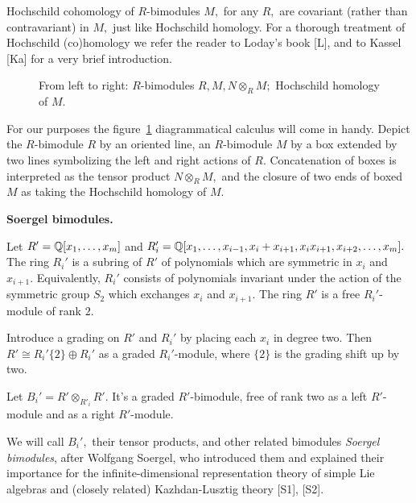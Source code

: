 \documentclass[12pt]{article}
\begin{document}
Hochschild cohomology of $R$-bimodules $M,$  for any $R,$ are 
covariant (rather than contravariant) in $M,$ just like Hochschild homology. 
For a thorough treatment of Hochschild (co)homology we refer the reader to 
Loday's book [L], and to Kassel [Ka] for a very brief introduction. 

\begin{figure} [htb]  \caption{From left to right: 
$R$-bimodules $R, M, N\otimes_R M;$ Hochschild homology of $M.$}\label{bimodules} 
\end{figure} 

\vspace{0.1in} 

For our purposes the figure~\ref{bimodules} diagrammatical calculus will come in 
handy. Depict 
the $R$-bimodule $R$ by an oriented line, an $R$-bimodule $M$ by a box extended 
by two lines symbolizing the left and right actions of $R.$ Concatenation of boxes 
is interpreted as the tensor product $N\otimes_R M,$ and the closure of two ends 
of boxed $M$ as taking the Hochschild homology of $M.$ 


\vspace{0.2in} 

{\bf Soergel bimodules.} 

\noindent 
Let $R'=\mathbb Q[x_1, \dots, x_m]$ and $R_i'=\mathbb Q[x_1, \dots, x_{i-1}, x_i+x_{i+1}, 
x_i x_{i+1}, x_{i+2}, \dots, x_m].$ The ring $R_i'$ is a subring of $R'$ of 
polynomials which are symmetric in $x_i$ and $x_{i+1}.$ Equivalently, 
$R_i'$ consists of polynomials invariant under the action of the symmetric 
group $S_2$ which exchanges $x_i$ and $x_{i+1}.$ The ring $R'$ is 
a free $R_i'$-module of rank $2.$ 

Introduce a grading on $R'$ and $R_i'$ by placing each $x_i$ 
in degree two. Then $R' \cong R_i'\{2\} \oplus R_i'$ as a graded 
$R_i'$-module, where $\{2\}$ is the grading shift up by two.  

Let $B_i'= R' \otimes_{R'_i} R'.$ It's a graded $R'$-bimodule, 
free of rank two as a left $R'$-module and as a right $R'$-module. 

\vspace{0.1in} 

We will call $B_i',$ their tensor products, and other related bimodules 
\emph{Soergel bimodules}, after Wolfgang Soergel, who introduced them 
and explained their importance for the infinite-dimensional 
representation theory of simple Lie algebras and (closely related) 
Kazhdan-Lusztig theory [S1], [S2]. 
\end{document}

